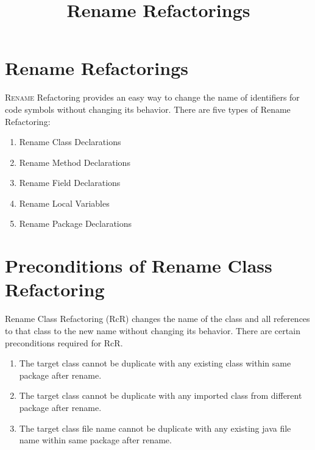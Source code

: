 \documentclass[10pt,conference]{IEEEtran}
\begin{document}
\title{Rename Refactorings}

\author{
\and
{}
\and
{}
}

\maketitle

\section{\textbf{Rename Refactorings}}
\lettrine{R} {ename} Refactoring provides an easy way to change the name of identifiers for code symbols without changing its behavior.
There are five types of Rename Refactoring: 
\begin{enumerate}
	\item Rename Class Declarations 
	\item Rename Method Declarations  
	\item Rename Field Declarations  
	\item Rename Local Variables  
	\item Rename Package Declarations
\end{enumerate}

\section{\textbf{Preconditions of Rename Class Refactoring}}
Rename Class Refactoring (RcR) changes the name of the class and all references to that class to the new name without changing its behavior. There are certain preconditions required for RcR. 
\begin{enumerate}
	\item The target class cannot be duplicate with any existing class within same package after rename.
	\item The target class cannot be duplicate with any imported class from different package after rename.
	\item The target class file name cannot be duplicate with any existing java file name within same package after rename.
\end{enumerate}
\end{document}
